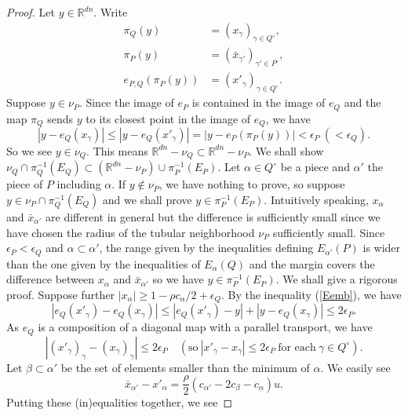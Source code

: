 \documentclass[10pt,a4paper]{amsart}
\newcommand{\RR}{\mathbb{R}}
\newcommand{\eps}{\epsilon}
\begin{document}
\begin{proof}
 Let $y\in \RR^{dn}$.
Write
\[
\begin{split}
\pi_{Q}(y)&=(x_\gamma)_{\gamma\in Q^\circ}, \\
\pi_{P}(y)&=(\bar x_{\gamma'})_{\gamma'\in P^\circ},\\
e_{P,Q}(\pi_P(y))&=(x'_\gamma)_{\gamma\in Q^\circ} .
\end{split}
\] Suppose $y\in \nu_P$.  Since the image of $e_P$ is contained in the image of $e_Q$ and the map $\pi_{Q}$ sends $y$ to its closest point in the image of $e_Q$, we have
\begin{equation}
|y-e_Q(x_\gamma)|\leq |y-e_Q(x'_\gamma)|=|y-e_P(\pi_P(y))|< \eps_P\ (<\eps_Q). \label{Eemb}
\end{equation}
So we see $y\in \nu_Q$. This means $\RR^{dn}-\nu_Q\subset \RR^{dn}-\nu_P$. We shall show $\nu_Q\cap \pi_Q^{-1}(E_Q)\subset (\RR^{dn}-\nu_P)\cup \pi_P^{-1}(E_P)$. Let $\alpha\in Q^\circ$ be a piece and $\alpha'$  the piece of $P$ including $\alpha$. If $y\not\in \nu_P$, we have nothing to prove, so suppose  $y\in \nu_P\cap\pi_Q^{-1}(E_Q)$ and we shall prove $y\in \pi_P^{-1}(E_P)$. Intuitively speaking, $x_\alpha$ and $\bar x_{\alpha'}$ are different in general but the difference is sufficiently small since we have chosen the radius of the tubular neighborhood $\nu_P$ sufficiently small. Since $\eps_P<\eps_Q$ and $\alpha\subset \alpha'$, the range given by the inequalities defining $E_{\alpha'}(P)$ is wider than the one given by the inequalities of $E_\alpha(Q)$ and the margin covers the difference between $x_\alpha$ and $\bar x_{\alpha'}$ so we have $y\in \pi_P^{-1}(E_P)$. We shall give a rigorous proof.  Suppose further $|x_\alpha|\geq 1-\rho c_\alpha/2+\eps_Q$. 
By the inequality (\ref{Eemb}), we have
\[
|e_Q(x'_\gamma)-e_Q(x_\gamma)|\leq |e_Q(x'_\gamma)-y|+|y-e_Q(x_\gamma)|\leq 2\eps_P.
\]
As $e_Q$ is a composition of a diagonal map with a parallel transport, we have
\begin{equation}
|(x'_\gamma)_\gamma-(x_\gamma)_\gamma |\leq 2\eps_P \quad (\text{so} \ |x'_\gamma-x_\gamma|\leq 2\eps_P\ \text{for each}\ \gamma\in Q^\circ). \label{Edifference}
\end{equation}
Let $\beta\subset \alpha'$ be the  set of elements smaller than the minimum of $\alpha$. We easily see 
\begin{equation}
\bar x_{\alpha'}-x'_\alpha=\frac{\rho}{2}(c_{\alpha'}-2c_\beta-c_\alpha)u. \label{Earrange}
\end{equation}
Putting these (in)equalities together, we see

\end{proof}
\end{document}
